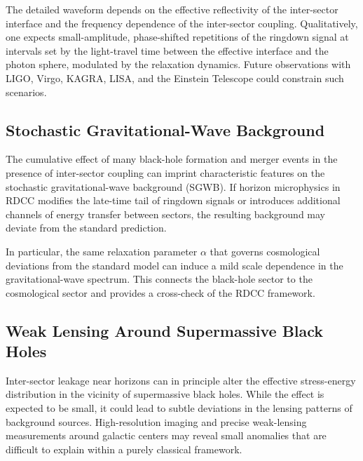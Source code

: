 \documentclass[11pt,a4paper]{article}
\begin{document}
The detailed waveform depends on the effective reflectivity of the inter-sector interface
and the frequency dependence of the inter-sector coupling. Qualitatively, one expects
small-amplitude, phase-shifted repetitions of the ringdown signal at intervals set by the
light-travel time between the effective interface and the photon sphere, modulated by the
relaxation dynamics. Future observations with LIGO, Virgo, KAGRA, LISA, and the
Einstein Telescope could constrain such scenarios.


\subsection{Stochastic Gravitational-Wave Background}

The cumulative effect of many black-hole formation and merger events in the presence of
inter-sector coupling can imprint characteristic features on the stochastic gravitational-wave
background (SGWB). If horizon microphysics in RDCC modifies the late-time tail of
ringdown signals or introduces additional channels of energy transfer between sectors, the
resulting background may deviate from the standard prediction.

In particular, the same relaxation parameter $\alpha$ that governs cosmological deviations
from the standard model can induce a mild scale dependence in the gravitational-wave
spectrum. This connects the black-hole sector to the cosmological sector and provides a
cross-check of the RDCC framework.


\subsection{Weak Lensing Around Supermassive Black Holes}

Inter-sector leakage near horizons can in principle alter the effective stress-energy
distribution in the vicinity of supermassive black holes. While the effect is expected to be
small, it could lead to subtle deviations in the lensing patterns of background sources.
High-resolution imaging and precise weak-lensing measurements around galactic centers
may reveal small anomalies that are difficult to explain within a purely classical framework.
\end{document}
